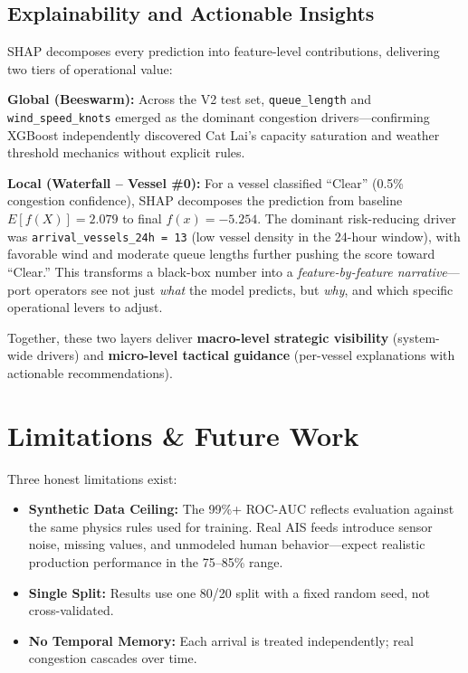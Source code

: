 \documentclass[11pt, a4paper]{article}
\begin{document}
\subsection{Explainability and Actionable Insights}

SHAP decomposes every prediction into feature-level contributions, delivering two tiers of operational value:

\textbf{Global (Beeswarm):} Across the V2 test set, \texttt{queue\_length} and \texttt{wind\_speed\_knots} emerged as the dominant congestion drivers---confirming XGBoost independently discovered Cat Lai's capacity saturation \cite{mm1_queue} and weather threshold mechanics \cite{pema_wind} without explicit rules.

\textbf{Local (Waterfall -- Vessel \#0):} For a vessel classified ``Clear'' (0.5\% congestion confidence), SHAP decomposes the prediction from baseline $E[f(X)] = 2.079$ to final $f(x) = -5.254$. The dominant risk-reducing driver was \texttt{arrival\_vessels\_24h = 13} (low vessel density in the 24-hour window), with favorable wind and moderate queue lengths further pushing the score toward ``Clear.'' This transforms a black-box number into a \textit{feature-by-feature narrative}---port operators see not just \textit{what} the model predicts, but \textit{why}, and which specific operational levers to adjust.

Together, these two layers deliver \textbf{macro-level strategic visibility} (system-wide drivers) and \textbf{micro-level tactical guidance} (per-vessel explanations with actionable recommendations).

\section{Limitations \& Future Work}

Three honest limitations exist:
\begin{itemize}[nosep, leftmargin=1.5em]
    \item \textbf{Synthetic Data Ceiling:} The 99\%+ ROC-AUC reflects evaluation against the same physics rules used for training. Real AIS feeds introduce sensor noise, missing values, and unmodeled human behavior---expect realistic production performance in the 75--85\% range.
    \item \textbf{Single Split:} Results use one 80/20 split with a fixed random seed, not cross-validated.
    \item \textbf{No Temporal Memory:} Each arrival is treated independently; real congestion cascades over time.
\end{itemize}
\end{document}
